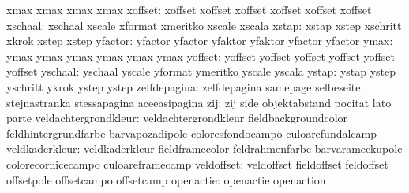                            xmax                      xmax
                           xmax                      xmax %
                  xoffset: xoffset                   xoffset
                           xoffset                   xoffset
                           xoffset                   xoffset %
                  xschaal: xschaal                   xscale
                           xformat                   xmeritko
                           xscale                    xscala %
                    xstap: xstap                     xstep
                           xschritt                  xkrok
                           xstep                     xstep %
                  yfactor: yfactor                   yfactor
                           yfaktor                   yfaktor
                           yfactor                   yfactor %
                     ymax: ymax                      ymax
                           ymax                      ymax
                           ymax                      ymax %
                  yoffset: yoffset                   yoffset
                           yoffset                   yoffset
                           yoffset                   yoffset %
                  yschaal: yschaal                   yscale
                           yformat                   ymeritko
                           yscale                    yscala %
                    ystap: ystap                     ystep
                           yschritt                  ykrok
                           ystep                     ystep %
             zelfdepagina: zelfdepagina              samepage
                           selbeseite                stejnastranka
                           stessapagina              aceeasipagina
                      zij: zij                       side
                           objektabstand             pocitat
                           lato                      parte
     veldachtergrondkleur: veldachtergrondkleur      fieldbackgroundcolor
                           feldhintergrundfarbe      barvapozadipole
                           coloresfondocampo         culoarefundalcamp
           veldkaderkleur: veldkaderkleur            fieldframecolor
                           feldrahmenfarbe           barvarameckupole
                           colorecornicecampo        culoareframecamp
               veldoffset: veldoffset                fieldoffset
                           feldoffset                offsetpole
                           offsetcampo               offsetcamp
                openactie: openactie                 openaction
